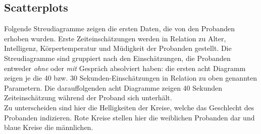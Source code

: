 \documentclass{Paper}
\begin{document}
\subsection{Scatterplots}
Folgende Streudiagramme zeigen die ersten Daten, die von den Probanden erhoben wurden. Erste Zeiteinschätzungen werden in Relation zu Alter, Intelligenz, Körpertemperatur und Müdigkeit der Probanden gestellt.
Die Streudiagramme sind gruppiert nach den Einschätzungen, die Probanden entweder \textit{ohne} oder \textit{mit} Gespräch absolviert haben: die ersten acht Diagramm zeigen je die 40 bzw. 30 Sekunden-Einschätzungen in Relation zu oben genannten Parametern. Die darauffolgenden acht Diagramme zeigen 40 Sekunden Zeiteinschätzung während der Proband sich unterhält.\\
Zu unterscheiden sind hier die Helligkeiten der Kreise, welche das Geschlecht des Probanden indizieren. Rote Kreise stellen hier die weiblichen Probanden dar und blaue Kreise die männlichen.
\end{document}
